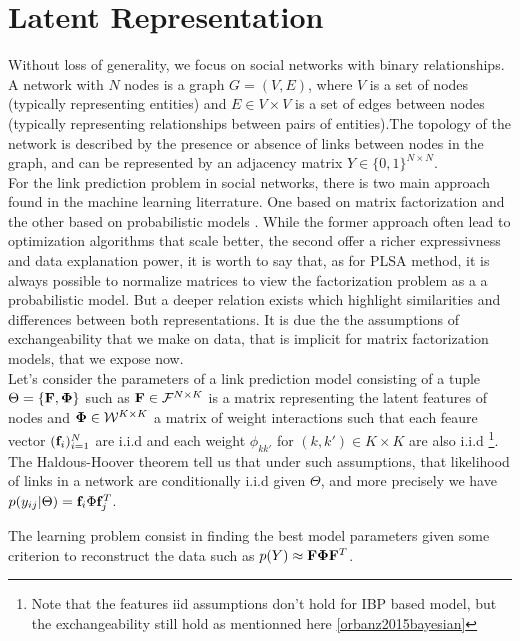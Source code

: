 \section{Latent Representation}
\label{sec:background}
Without loss of generality, we focus on social networks with binary relationships. A network with $N$ nodes is a graph $G = (V,E)$, where $V$ is a set of nodes (typically representing entities) and $E \in V \times V$ is a set of edges between nodes (typically representing relationships between pairs of entities).The topology of the network is described by the presence or absence of links between nodes in the graph, and can be represented by an adjacency matrix $Y \in \{0,1\}^{N\times N}$.\\

For the link prediction problem in social networks, there is two main approach found in the machine learning literrature. One based on matrix factorization \cite{menon2011link} and the other based on probabilistic models \cite{goldenberg2010survey}. While the former approach often lead to optimization algorithms that scale better, the second offer a richer expressivness and data explanation power, it is worth to say that, as for PLSA method, it is always possible to normalize matrices to view the factorization problem as a a probabilistic model. But a deeper relation exists which highlight similarities and differences between both representations. It is due the the assumptions of exchangeability that we make on data, that is implicit for matrix factorization models, that we expose now.\\

Let's consider the parameters of a link prediction model consisting of a tuple $\Theta = \{ \mathbf{F} , \mathbf{\Phi}\}$ such as $\mathbf{F} \in \mathcal{F}^{N\times K}$ is a matrix representing the latent features of nodes and $\mathbf{\Phi} \in \mathcal{W}^{K\times K}$ a matrix of weight interactions such that each feaure vector $(\mathbf{f}_i)_{i=1}^N$ are i.i.d and each weight $\phi_{kk'}$ for $(k,k') \in K\times K$ are also i.i.d \footnote{Note that the features iid assumptions don't hold for IBP based model, but the exchangeability still hold as mentionned here \ref{orbanz2015bayesian}}. The Haldous-Hoover theorem \cite{orbanz2015bayesian} tell us that under such assumptions, that likelihood of links in a network are conditionally i.i.d given $\Theta$, and more precisely we have $p(y_{ij}|\Theta) = \mathbf{f}_i \Phi \mathbf{f}_j^T$.

The learning problem consist in finding the best model parameters given some criterion to reconstruct the data such as $p(Y) \approx \mathbf{F}\mathbf{\Phi}\mathbf{F}^T$. 

